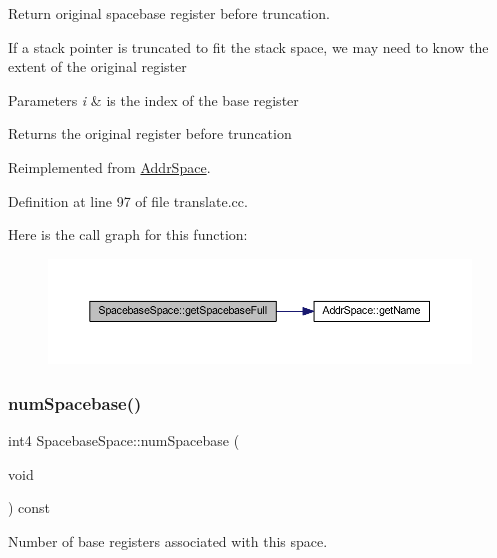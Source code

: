 Return original spacebase register before truncation. 

If a stack pointer is truncated to fit the stack space, we may need to know the extent of the original register 
\begin{DoxyParams}{Parameters}
{\em i} & is the index of the base register \\
\hline
\end{DoxyParams}
\begin{DoxyReturn}{Returns}
the original register before truncation 
\end{DoxyReturn}


Reimplemented from \mbox{\hyperlink{class_addr_space_a8fb25cf630f64ad73a137393b48067a0}{Addr\+Space}}.



Definition at line 97 of file translate.\+cc.

Here is the call graph for this function\+:
\nopagebreak
\begin{figure}[H]
\begin{center}
\leavevmode
\includegraphics[width=350pt]{class_spacebase_space_aa6c1b1af9de6666ff998996d647ff44d_cgraph}
\end{center}
\end{figure}
\mbox{\label{class_spacebase_space_a4d1969883a570388a7e071af0b943f0e}} 
\subsubsection{\texorpdfstring{numSpacebase()}{numSpacebase()}}
{\footnotesize\ttfamily int4 Spacebase\+Space\+::num\+Spacebase (\begin{DoxyParamCaption}\item[{void}]{ }\end{DoxyParamCaption}) const\hspace{0.3cm}{\ttfamily [virtual]}}



Number of base registers associated with this space. 


